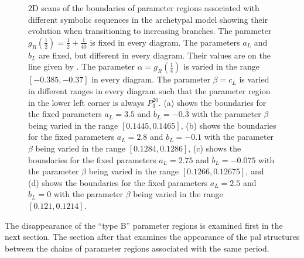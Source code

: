 \begin{figure}
{		\label{fig:add.change.regions.3}
	}
	\caption[2D scans of the boundaries of parameter regions associated with different symbolic sequences in the archetypal model showing their evolution when transitioning to increasing branches]{
		2D scans of the boundaries of parameter regions associated with different symbolic sequences in the archetypal model showing their evolution when transitioning to increasing branches.
		The parameter $g_R\left(\frac{1}{2}\right) = \frac{1}{2} + \frac{1}{40}$ is fixed in every diagram.
		The parameters $a_L$ and $b_L$ are fixed, but different in every diagram.
		Their values are on the line given by .
		The parameter $\alpha = g_R\left(\frac{1}{4}\right)$ is varied in the range $[-0.385, -0.37]$ in every diagram.
		The parameter $\beta = c_L$ is varied in different ranges in every diagram such that the parameter region in the lower left corner is always $P^{20}_3$.
		(a) shows the boundaries for the fixed parameters $a_L = 3.5$ and $b_L = -0.\overline{3}$ with the parameter $\beta$ being varied in the range $[0.1445, 0.1465]$,
		(b) shows the boundaries for the fixed parameters $a_L = 2.8$ and $b_L = -0.1$ with the parameter $\beta$ being varied in the range $[0.1284, 0.1286]$,
		(c) shows the boundaries for the fixed parameters $a_L = 2.75$ and $b_L = -0.075$ with the parameter $\beta$ being varied in the range $[0.1266, 0.12675]$,
		and (d) shows the boundaries for the fixed parameters $a_L = 2.5$ and $b_L = 0$ with the parameter $\beta$ being varied in the range $[0.121, 0.1214]$.
	}
	\label{fig:add.change.regions}
\end{figure}

The disappearance of the ``type B'' parameter regions is examined first in the next section.
The section after that examines the appearance of the \gls{pal} structures between the chains of parameter regions associated with the same period.

\clearpage



